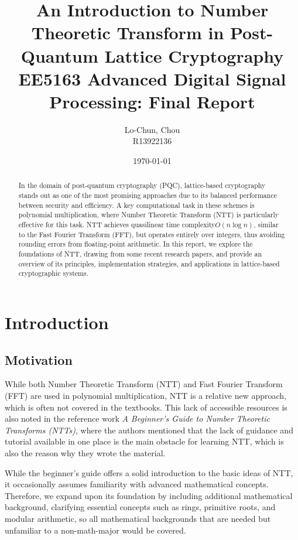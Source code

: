 \documentclass[12pt]{article}
\title{
    An Introduction to Number Theoretic Transform in Post-Quantum Lattice Cryptography \\
    \large EE5163 Advanced Digital Signal Processing: Final Report 
}
\author[1]{
    Lo-Chun, Chou \\
    \small R13922136
}
\affil[1]{Department of Computer Science, National Taiwan University}
\date{\today}
\begin{document}
\maketitle

\begin{abstract}
    In the domain of post-quantum cryptography (PQC), 
    lattice-based cryptography stands out as one of the most promising approaches due to its balanced performance between security and efficiency. 
    A key computational task in these schemes is polynomial multiplication, 
    where Number Theoretic Transform (NTT) is particularly effective for this task. 
    NTT achieves quasilinear time complexity$O(n \log n)$, 
    similar to the Fast Fourier Transform (FFT), 
    but operates entirely over integers, 
    thus avoiding rounding errors from floating-point arithmetic.
    In this report, we explore the foundations of NTT, 
    drawing from some recent research papers, 
    and provide an overview of its principles, implementation strategies, 
    and applications in lattice-based cryptographic systems.
\end{abstract}

\section{Introduction}

\subsection{Motivation}

While both Number Theoretic Transform (NTT) and Fast Fourier Transform (FFT) are used in polynomial multiplication, 
NTT is a relative new approach, which is often not covered in the textbooks. 
This lack of accessible resources is also noted in the reference work 
\emph{A Beginner's Guide to Number Theoretic Transforms (NTTs)}, 
where the authors mentioned that the lack of guidance and tutorial available in one place is the main obstacle for learning NTT\cite{beginner_guide}, 
which is also the reason why they wrote the material.

While the beginner's guide offers a solid introduction to the basic ideas of NTT, 
it occasionally assumes familiarity with advanced mathematical concepts. 
Therefore, we expand upon its foundation by including additional mathematical background, 
clarifying essential concepts such as rings, primitive roots, and modular arithmetic, 
so all mathematical backgrounds that are needed but unfamiliar to a non-math-major would be covered.
\end{document}
